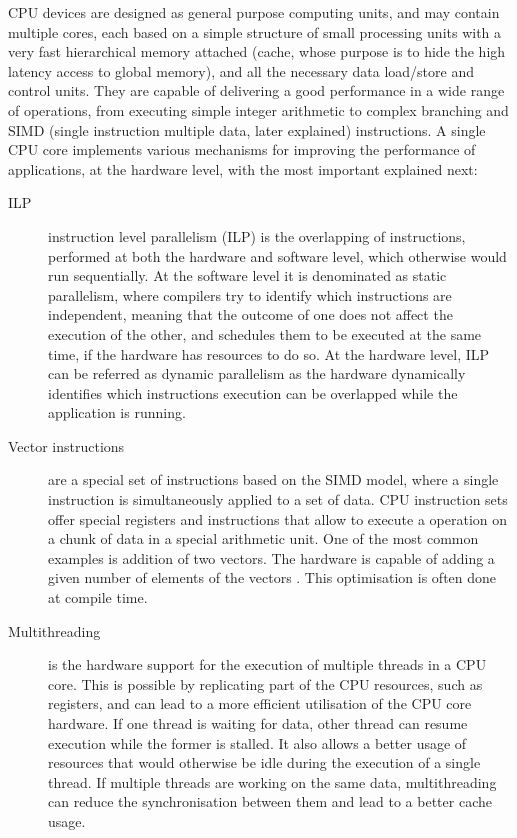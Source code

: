CPU devices are designed as general purpose computing units, and may contain multiple cores, each based on a simple structure of small processing units with a very fast hierarchical memory attached (cache, whose purpose is to hide the high latency access to global memory), and all the necessary data load/store and control units. They are capable of delivering a good performance in a wide range of operations, from executing simple integer arithmetic to complex branching and SIMD (single instruction multiple data, later explained) instructions. A single CPU core implements various mechanisms for improving the performance of applications, at the hardware level, with the most important explained next:

\begin{center}
	\begin{description}
		\item[ILP] instruction level parallelism (ILP) is the overlapping of instructions, performed at both the hardware and software level, which otherwise would run sequentially. At the software level it is denominated as static parallelism, where compilers try to identify which instructions are independent, meaning that the outcome of one does not affect the execution of the other, and schedules them to be executed at the same time, if the hardware has resources to do so. At the hardware level, ILP can be referred as dynamic parallelism as the hardware dynamically identifies which instructions execution can be overlapped while the application is running.

		\item[Vector instructions] are a special set of instructions based on the SIMD model, where a single instruction is simultaneously applied to a set of data. CPU instruction sets offer special registers and instructions that allow to execute a operation on a chunk of data in a special arithmetic unit. One of the most common examples is addition of two vectors. The hardware is capable of adding a given number of elements of the vectors . This optimisation is often done at compile time.

		\item[Multithreading] is the hardware support for the execution of multiple threads in a CPU core. This is possible by replicating part of the CPU resources, such as registers, and can lead to a more efficient utilisation of the CPU core hardware. If one thread is waiting for data, other thread can resume execution while the former is stalled. It also allows a better usage of resources that would otherwise be idle during the execution of a single thread. If multiple threads are working on the same data, multithreading can reduce the synchronisation between them and lead to a better cache usage.
	\end{description}
\end{center}

